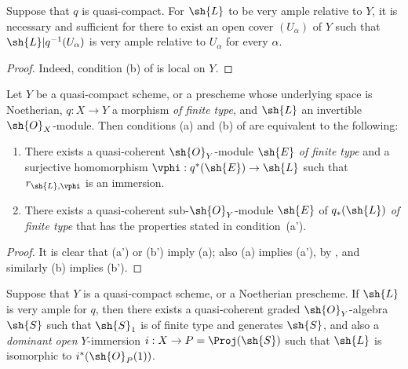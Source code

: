 \begin{corollary}[4.4.5]
\label{II.4.4.5}
Suppose that $q$ is quasi-compact.
For $\sh{L}$ to be very ample relative to $Y$, it is necessary and sufficient for there to exist an open cover $(U_\alpha)$ of $Y$ such that $\sh{L}|q^{-1}(U_\alpha)$ is very ample relative to $U_\alpha$ for every $\alpha$.
\end{corollary}

\begin{proof}
Indeed, condition (b) of  is local on $Y$.
\end{proof}

\begin{proposition}[4.4.6]
\label{II.4.4.6}
Let $Y$ be a quasi-compact scheme, or a prescheme whose underlying space is Noetherian, $q:X\to Y$ a morphism \emph{of finite type}, and $\sh{L}$ an invertible $\sh{O}_X$-module.
Then conditions (a) and (b) of  are equivalent to the following:
\begin{enumerate}
  \item[\rm{(a')}] There exists a quasi-coherent $\sh{O}_Y$-module $\sh{E}$ \emph{of finite type} and a surjective homomorphism $\vphi:q^*(\sh{E})\to\sh{L}$ such that $r_{\sh{L},\vphi}$ is an immersion.
  \item[\rm{(b')}] There exists a quasi-coherent sub-$\sh{O}_Y$-module $\sh{E}$ of $q_*(\sh{L})$ \emph{of finite type} that has the properties stated in condition~(a').
\end{enumerate}
\end{proposition}

\begin{proof}
It is clear that (a') or (b') imply (a);
also (a) implies (a'), by , and similarly (b) implies (b').
\end{proof}

\begin{corollary}[4.4.7]
\label{II.4.4.7}
Suppose that $Y$ is a quasi-compact scheme, or a Noetherian prescheme.
If $\sh{L}$ is very ample for $q$, then there exists a quasi-coherent graded $\sh{O}_Y$-algebra $\sh{S}$ such that $\sh{S}_1$ is of finite type and generates $\sh{S}$, and also a \emph{dominant open} $Y$-immersion $i:X\to P=\Proj(\sh{S})$ such that $\sh{L}$ is isomorphic to $i^*(\sh{O}_P(1))$.
\end{corollary}

